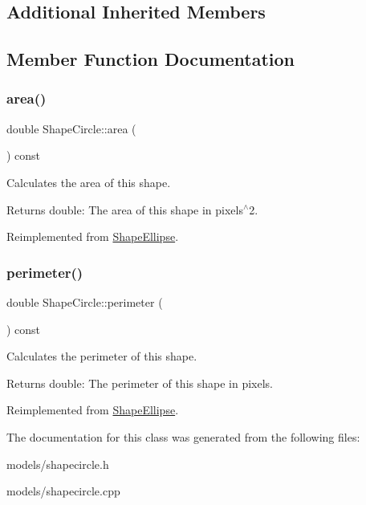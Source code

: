 \subsection*{Additional Inherited Members}


\subsection{Member Function Documentation}
\mbox{\label{class_shape_circle_aebc30fb4ad7165778deb75f0bd2d69bd}} 
\subsubsection{\texorpdfstring{area()}{area()}}
{\footnotesize\ttfamily double Shape\+Circle\+::area (\begin{DoxyParamCaption}{ }\end{DoxyParamCaption}) const\hspace{0.3cm}{\ttfamily [virtual]}}



Calculates the area of this shape. 

\begin{DoxyReturn}{Returns}
double\+: The area of this shape in pixels$^\wedge$2. 
\end{DoxyReturn}


Reimplemented from \mbox{\hyperlink{class_shape_ellipse_a08287b301b7501eb941805eaf85fc00c}{Shape\+Ellipse}}.

\mbox{\label{class_shape_circle_ad393d13676b0d0fcb36346b9a90b74af}} 
\subsubsection{\texorpdfstring{perimeter()}{perimeter()}}
{\footnotesize\ttfamily double Shape\+Circle\+::perimeter (\begin{DoxyParamCaption}{ }\end{DoxyParamCaption}) const\hspace{0.3cm}{\ttfamily [virtual]}}



Calculates the perimeter of this shape. 

\begin{DoxyReturn}{Returns}
double\+: The perimeter of this shape in pixels. 
\end{DoxyReturn}


Reimplemented from \mbox{\hyperlink{class_shape_ellipse_a397c01c912105854e065f6c2d766f73a}{Shape\+Ellipse}}.



The documentation for this class was generated from the following files\+:\begin{DoxyCompactItemize}
\item 
models/shapecircle.\+h\item 
models/shapecircle.\+cpp\end{DoxyCompactItemize}
